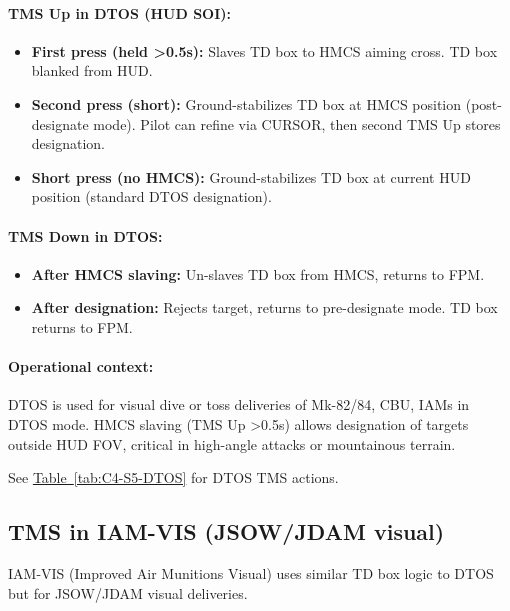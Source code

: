 \documentclass[11pt, a4paper, twoside]{report}
\newcommand{\tabref}[1]{\hyperref[#1]{Table~\ref*{#1}}}
\begin{document}
\paragraph{TMS Up in DTOS (HUD SOI):}
\begin{itemize}
    \item \textbf{First press (held >0.5s):} Slaves TD box to HMCS aiming cross. TD box blanked from HUD.
    \item \textbf{Second press (short):} Ground-stabilizes TD box at HMCS position (post-designate mode). Pilot can refine via CURSOR, then second TMS Up stores designation.
    \item \textbf{Short press (no HMCS):} Ground-stabilizes TD box at current HUD position (standard DTOS designation).
\end{itemize}

\paragraph{TMS Down in DTOS:}
\begin{itemize}
    \item \textbf{After HMCS slaving:} Un-slaves TD box from HMCS, returns to FPM.
    \item \textbf{After designation:} Rejects target, returns to pre-designate mode. TD box returns to FPM.
\end{itemize}

\paragraph{Operational context:}
DTOS is used for visual dive or toss deliveries of Mk-82/84, CBU, IAMs in DTOS mode. HMCS slaving (TMS Up >0.5s) allows designation of targets outside HUD FOV, critical in high-angle attacks or mountainous terrain.

See \tabref{tab:C4-S5-DTOS} for DTOS TMS actions.

\subsection{TMS in IAM-VIS (JSOW/JDAM visual)}
\label{sec:C4-S5-S3}

IAM-VIS (Improved Air Munitions Visual) uses similar TD box logic to DTOS but for JSOW/JDAM visual deliveries.
\end{document}
